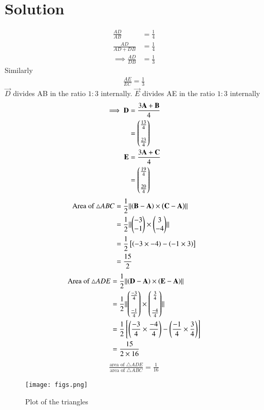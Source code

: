\documentclass[journal,12pt,twocolumn]{IEEEtran}
\begin{document}
\section{Solution}
\begin{align}
    \frac{AD}{AB}&=\frac{1}{4}\\
    \frac{AD}{AD+DB}&=\frac{1}{4}\\
    \implies \frac{AD}{DB}&=\frac{1}{3}
\end{align}
Similarly
\begin{align}
    \frac{AE}{EC}=\frac{1}{3}
\end{align}
$\vec{D}$ divides AB in the ratio $1:3$ internally. $\vec{E}$ divides AE in the ratio $1:3$ internally
\begin{align}
    \implies \mathbf{D} &=\frac{3\mathbf{A}+\mathbf{B}}{4}\\
    &=\begin{pmatrix}\frac{13}{4}\\\\\frac{23}{4}\end{pmatrix}\\
    \mathbf{E} &=\frac{3\mathbf{A}+\mathbf{C}}{4}\\
    &=\begin{pmatrix}\frac{19}{4}\\\\\frac{20}{4}\end{pmatrix}
\end{align}
\begin{align}
    \text{Area of } \triangle ABC &= \frac{1}{2}\lVert\left(\mathbf{B-A}\right) \times \left(\mathbf{C-A}\right)\rVert\\
    &=\frac{1}{2}\lVert\begin{pmatrix}-3\\-1\end{pmatrix}\times \begin{pmatrix}3\\-4\end{pmatrix}\rVert\\
    &=\frac{1}{2}{}\left[\left(-3\times -4\right)-\left(-1 \times 3\right)\right]\\
    &=\frac{15}{2}
\end{align}
\begin{align}
    \text{Area of } \triangle ADE &= \frac{1}{2}\lVert\left(\mathbf{D-A}\right) \times \left(\mathbf{E-A}\right)\rVert\\
    &=\frac{1}{2}\lVert\begin{pmatrix}\frac{-3}{4}\\\\\frac{-1}{4}\end{pmatrix}\times \begin{pmatrix}\frac{3}{4}\\\\\frac{-4}{4}\end{pmatrix}\rVert\\
    &=\frac{1}{2}{}\left[\left(\frac{-3}{4}\times \frac{-4}{4}\right)-\left(\frac{-1}{4} \times \frac{3}{4}\right)\right]\\
    &=\frac{15}{2\times16}
\end{align}
\begin{align}
    \frac{\text{area of } \triangle ADE}{\text{area of } \triangle ABC}=\frac{1}{16}
\end{align}
\begin{figure}[!h]
 \centering
 \texttt{[image: figs.png]}
 \caption{Plot of the triangles}
 \label{plot}
\end{figure}
\end{document}
